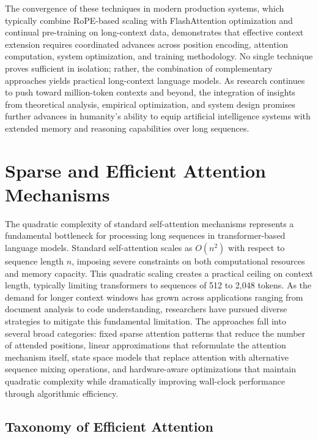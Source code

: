 \documentclass[11pt,letterpaper]{article}
\begin{document}
The convergence of these techniques in modern production systems, which typically combine RoPE-based scaling with FlashAttention optimization and continual pre-training on long-context data, demonstrates that effective context extension requires coordinated advances across position encoding, attention computation, system optimization, and training methodology. No single technique proves sufficient in isolation; rather, the combination of complementary approaches yields practical long-context language models. As research continues to push toward million-token contexts and beyond, the integration of insights from theoretical analysis, empirical optimization, and system design promises further advances in humanity's ability to equip artificial intelligence systems with extended memory and reasoning capabilities over long sequences.


\section{Sparse and Efficient Attention Mechanisms}
\label{sec:sparse}

The quadratic complexity of standard self-attention mechanisms represents a fundamental bottleneck for processing long sequences in transformer-based language models. Standard self-attention scales as $O(n^2)$ with respect to sequence length $n$, imposing severe constraints on both computational resources and memory capacity. This quadratic scaling creates a practical ceiling on context length, typically limiting transformers to sequences of 512 to 2,048 tokens. As the demand for longer context windows has grown across applications ranging from document analysis to code understanding, researchers have pursued diverse strategies to mitigate this fundamental limitation. The approaches fall into several broad categories: fixed sparse attention patterns that reduce the number of attended positions, linear approximations that reformulate the attention mechanism itself, state space models that replace attention with alternative sequence mixing operations, and hardware-aware optimizations that maintain quadratic complexity while dramatically improving wall-clock performance through algorithmic efficiency.

\subsection{Taxonomy of Efficient Attention}
\end{document}
